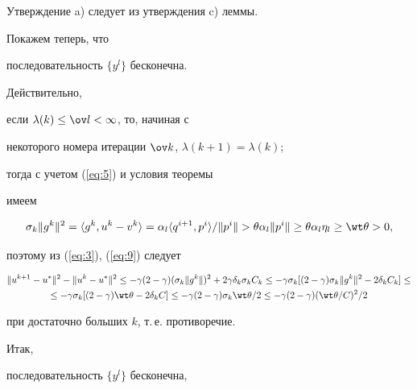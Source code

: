 \begin{pf}


Утверждение a) следует из утверждения c) леммы.


Покажем теперь, что


последовательность $\{ y^{l}\}$ бесконечна.


Действительно,


если $ \lambda (k) \leq \ov l < \infty $, то, начиная с


некоторого номера итерации $ \ov k$, $\lambda (k+1)= \lambda (k)$;


тогда с учетом (\ref{eq:5}) и условия теоремы


имеем


$$


\sigma _{k} \| g^{k} \| ^{2}=


\langle g^{k}, u^{k}-v^{k} \rangle


= \alpha _{l} \langle q^{i+1}, p^{i} \rangle /


\| p^{i}\|


> \theta \alpha _{l} \| p^{i} \|


\geq \theta \alpha _{l} \eta _{l}


\geq \wt \theta > 0,


$$


поэтому из (\ref{eq:3}), (\ref{eq:9}) следует


\begin{gather*}


\|u^{k+1}-u^{*}\|^{2} - \| u^{k}- u^{*}\| ^{2} \leq -


\gamma (2-\gamma )(\sigma _{k} \| g^{k} \| )^{2}


+ 2 \gamma \delta _{k} \sigma _{k} C_{k}\le -\gamma \sigma _{k}


[(2-\gamma ) \sigma _{k} \| g^{k} \| ^{2}-2 \delta _{k} C_{k}]\le \\


\le - \gamma \sigma _{k}


[(2-\gamma) \wt \theta -2 \delta _{k} C ]


\le  - \gamma (2-\gamma) \sigma _{k} \wt \theta /2


\le -  \gamma (2-\gamma ) (\wt \theta /C)^{2} / 2


\end{gather*}


при достаточно больших $k$, т.\,е.{} противоречие.


Итак,


последовательность $\{ y^{l}\}$ бесконечна,



\end{pf}
